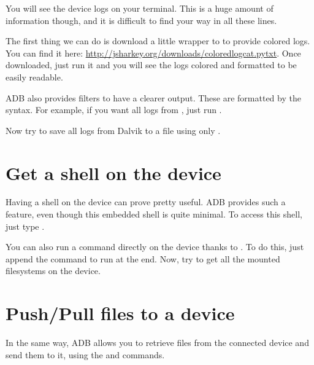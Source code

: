 You will see the device logs on your terminal. This is a huge amount
of information though, and it is difficult to find your way in all
these lines.

The first thing we can do is download a little wrapper to 
to provide colored logs. You can find it here:
\url{http://jsharkey.org/downloads/coloredlogcat.pytxt}. Once
downloaded, just run it and you will see the logs colored and
formatted to be easily readable.

ADB also provides filters to have a clearer output. These are
formatted by the  syntax. For example, if you want
all logs from , just run .

Now try to save all logs from Dalvik to a file using only .

\section{Get a shell on the device}

Having a shell on the device can prove pretty useful. ADB provides
such a feature, even though this embedded shell is quite minimal. To
access this shell, just type .

You can also run a command directly on the device thanks to
. To do this, just append the command to run at the
end. Now, try to get all the mounted filesystems on the device.

\section{Push/Pull files to a device}

In the same way, ADB allows you to retrieve files from the connected
device and send them to it, using the  and 
commands.

